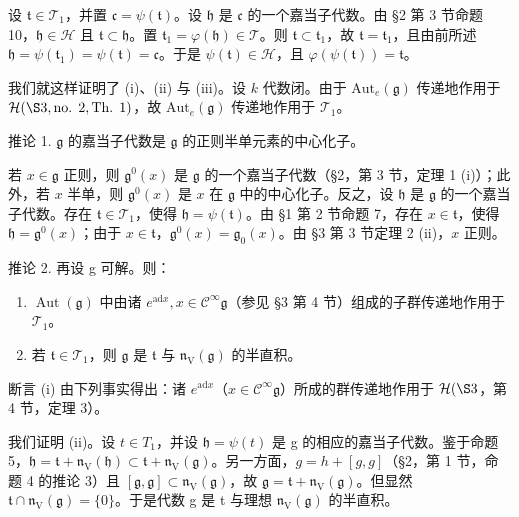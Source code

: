 设 \(\mathfrak{t} \in \mathcal{T}_1\)，并置 \(\mathfrak{c} = \psi(\mathfrak{t})\)。设 \(\mathfrak{h}\) 是 \(\mathfrak{c}\) 的一个嘉当子代数。由 §2 第 3 节命题 10，\(\mathfrak{h} \in \mathcal{H}\) 且 \(\mathfrak{t} \subset \mathfrak{h}\)。置 \(\mathfrak{t}_1 = \varphi(\mathfrak{h}) \in \mathcal{T}\)。则 \(\mathfrak{t} \subset \mathfrak{t}_1\)，故 \(\mathfrak{t} = \mathfrak{t}_1\)，且由前所述 \(\mathfrak{h} = \psi(\mathfrak{t}_1) = \psi(\mathfrak{t}) = \mathfrak{c}\)。于是 \(\psi(\mathfrak{t}) \in \mathcal{H}\)，且 \(\varphi(\psi(\mathfrak{t})) = \mathfrak{t}\)。

我们就这样证明了 (i)、(ii) 与 (iii)。设 \(k\) 代数闭。由于 \(\mathrm{Aut}_e(\mathfrak{g})\) 传递地作用于 \(\mathcal{H}(\S 3, \text{no. } 2, \text{Th. } 1)\)，故 \(\mathrm{Aut}_e(\mathfrak{g})\) 传递地作用于 \(\mathcal{T}_1\)。

推论 1. \(\mathfrak{g}\) 的嘉当子代数是 \(\mathfrak{g}\) 的正则半单元素的中心化子。

若 \(x \in \mathfrak{g}\) 正则，则 \(\mathfrak{g}^0(x)\) 是 \(\mathfrak{g}\) 的一个嘉当子代数（§2，第 3 节，定理 1 (i)）；此外，若 \(x\) 半单，则 \(\mathfrak{g}^0(x)\) 是 \(x\) 在 \(\mathfrak{g}\) 中的中心化子。反之，设 \(\mathfrak{h}\) 是 \(\mathfrak{g}\) 的一个嘉当子代数。存在 \(\mathfrak{t} \in \mathcal{T}_1\)，使得 \(\mathfrak{h} = \psi(\mathfrak{t})\)。由 §1 第 2 节命题 7，存在 \(x \in \mathfrak{t}\)，使得 \(\mathfrak{h} = \mathfrak{g}^0(x)\)；由于 \(x \in \mathfrak{t}\)，\(\mathfrak{g}^0(x) = \mathfrak{g}_0(x)\)。由 §3 第 3 节定理 2 (ii)，\(x\) 正则。

推论 2. 再设 g 可解。则：

\begin{enumerate}
\def\labelenumi{(\roman{enumi})}
\item
  \(\operatorname{Aut}(\mathfrak{g})\) 中由诸 \(e^{\mathrm{ad}x}, x \in \mathcal{C}^{\infty}\mathfrak{g}\)（参见 §3 第 4 节）组成的子群传递地作用于 \(\mathcal{T}_1\)。
\item
  若 \(\mathfrak{t} \in \mathcal{T}_1\)，则 \(\mathfrak{g}\) 是 \(\mathfrak{t}\) 与 \(\mathfrak{n}_{\mathrm{V}}(\mathfrak{g})\) 的半直积。
\end{enumerate}

断言 (i) 由下列事实得出：诸 \(e^{\mathrm{ad}x}\)（\(x \in \mathcal{C}^{\infty}\mathfrak{g}\)）所成的群传递地作用于 \(\mathcal{H}(\S 3\)，第 4 节，定理 3）。

我们证明 (ii)。设 \(t \in T_{1}\)，并设 \(\mathfrak{h} = \psi(t)\) 是 g 的相应的嘉当子代数。鉴于命题 5，\(\mathfrak{h} = \mathfrak{t} + \mathfrak{n}_{\mathrm{V}}(\mathfrak{h}) \subset \mathfrak{t} + \mathfrak{n}_{\mathrm{V}}(\mathfrak{g})\)。另一方面，\(g = h + [g, g]\)（§2，第 1 节，命题 4 的推论 3）且 \([\mathfrak{g}, \mathfrak{g}] \subset \mathfrak{n}_{\mathrm{V}}(\mathfrak{g})\)，故 \(\mathfrak{g} = \mathfrak{t} + \mathfrak{n}_{\mathrm{V}}(\mathfrak{g})\)。但显然 \(\mathfrak{t} \cap \mathfrak{n}_{\mathrm{V}}(\mathfrak{g}) = \{0\}\)。于是代数 g 是 t 与理想 \(\mathfrak{n}_{\mathrm{V}}(\mathfrak{g})\) 的半直积。

